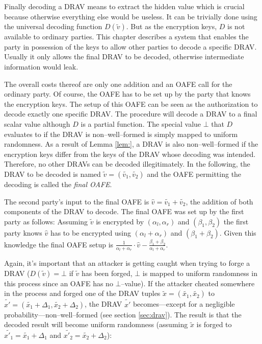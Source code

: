 

\label{sec:drav-final-decoding}

Finally decoding a DRAV means to extract the hidden value which is crucial
because otherwise everything else would be useless. It can be trivially done
using the universal decoding function $D(\widetilde{v})$. But as the encryption
keys, $D$ is not available to ordinary parties. This chapter describes a system
that enables the party in possession of the keys to allow other parties to
decode a specific DRAV. Usually it only allows the final DRAV to be decoded,
otherwise intermediate information would leak.

The overall costs thereof are only one addition and an OAFE call for the
ordinary party. Of course, the OAFE has to be set up by the party that knows the
encryption keys. The setup of this OAFE can be seen as the authorization to
decode exactly one specific DRAV. The procedure will decode a DRAV to a final
scalar value although $D$ is a partial function. The special value $\bot$ that
$D$ evaluates to if the DRAV is non--well--formed is simply mapped to uniform
randomness. As a result of Lemma \ref{lem:}, a DRAV is also non--well--formed if
the encryption keys differ from the keys of the DRAV whose decoding was
intended. Therefore, no other DRAVs can be decoded illegitimately. In the
following, the DRAV to be decoded is named $\widetilde{v} = (\widetilde{v_1},
\widetilde{v_2})$ and the OAFE permitting the decoding is called the \emph{final
OAFE}.

The second party's input to the final OAFE is $\widehat{v} = \widetilde{v_1} +
\widetilde{v_2}$, the addition of both components of the DRAV to decode.  The
final OAFE was set up by the first party as follows: Assuming $\widetilde{v}$ is
encrypted by $(\alpha_l, \alpha_r)$ and $(\beta_1, \beta_2)$ the first party
knows $\widehat{v}$ has to be encrypted using $(\alpha_l + \alpha_r)$ and
$(\beta_1 + \beta_2)$.  Given this knowledge the final OAFE setup is
$\frac{1}{\alpha_l + \alpha_r} \cdot \widehat{v} - \frac{\beta_1 +
\beta_2}{\alpha_l + \alpha_r}$.

Again, it's important that an attacker is getting caught when trying to forge a
DRAV ($D(\widetilde{v}) = \bot$ if $\widetilde{v}$ has been forged, $\bot$ is
mapped to uniform randomness in this process since an OAFE has no
$\bot$--value). If the attacker cheated somewhere in the process and forged one
of the DRAV tuples $\widetilde{x} = (\widetilde{x_1}, \widetilde{x_2})$ to
$\widetilde{x'} = (\widetilde{x_1} + \Delta_1, \widetilde{x_2} + \Delta_2)$, the
DRAV $\widetilde{x'}$ becomes---except for a negligible
probability---non--well--formed (see section \ref{sec:drav}). The result is that
the decoded result will become uniform randomness (assuming $\widetilde{x}$ is
forged to $\widetilde{x'_1} = \widetilde{x_1} + \Delta_1$ and $\widetilde{x'_2}
= \widetilde{x_2} + \Delta_2$):

